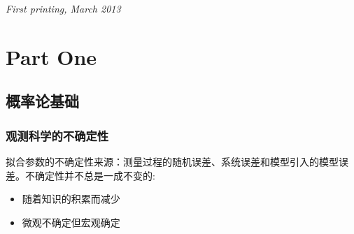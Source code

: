 \documentclass[11pt,fleqn]{book} %
\begin{document}
\noindent \textit{First printing, March 2013} %




\pagestyle{empty} %

\tableofcontents %

\cleardoublepage %

\pagestyle{fancy} %


\part{Part One}



\chapter{概率论基础}

\section{观测科学的不确定性}

拟合参数的不确定性来源：测量过程的随机误差、系统误差和模型引入的模型误差。不确定性并不总是一成不变的:
\begin{itemize}
    \item 随着知识的积累而减少
    \item 微观不确定但宏观确定
\end{itemize}
\end{document}
